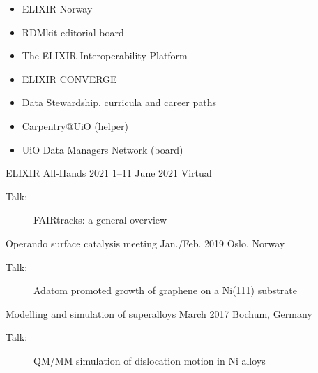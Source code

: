 \documentclass[10pt,a4paper,ragged2e,withhyper]{altacv}
\begin{document}
\begin{paracol}{2}

        {
          \begin{itemize}
          \item ELIXIR Norway
          \item RDMkit editorial board
          \item The ELIXIR Interoperability Platform
          \item ELIXIR CONVERGE
          \end{itemize}
        }
        {}
        {}
        
        {
          \begin{itemize}
          \item Data Stewardship, curricula and career paths
          \end{itemize}
        }
        {}
        {}

        {
          \begin{itemize}
          \item Carpentry@UiO (helper)
          \item UiO Data Managers Network (board)
          \end{itemize}
        }
        {}
        {}

\cvevent{}
        {ELIXIR All-Hands 2021}
        {1--11 June 2021}
        {Virtual}
        \small{
          \begin{description}
          \item[Talk:] FAIRtracks: a general overview
          \end{description}
        }



\smallskip

\cvevent{}
        {Operando surface catalysis meeting}
        {Jan./Feb. 2019}
        {Oslo, Norway}
        \small{
          \begin{description}
          \item[Talk:] Adatom promoted growth of graphene on a Ni(111) substrate
          \end{description}
        }

\smallskip

\cvevent{}
        {Modelling and simulation of superalloys}
        {March 2017}
        {Bochum, Germany}
        \small{
          \begin{description}
          \item[Talk:] QM/MM simulation of dislocation motion in Ni alloys
          \end{description}
        }




\end{paracol}
\end{document}
